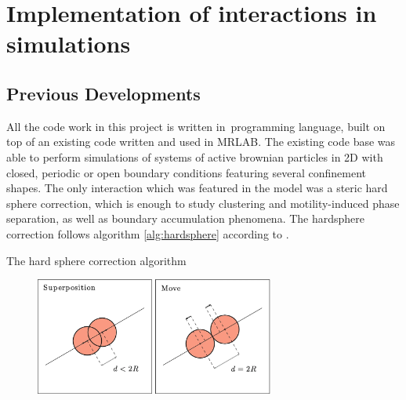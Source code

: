 \documentclass[../../master_thesis_np.tex]{subfiles}
\begin{document}
\chapter[Interaction Implementation]{Implementation of interactions in simulations}
	\section{Previous Developments}
	All the code work in this project is written in\ \julia programming language, built on top of an existing code written and used in {\color{blue} MRLAB}. The existing code base was able to perform simulations of systems of active brownian particles in 2D with closed, periodic or open boundary conditions featuring several confinement shapes. The only interaction which was featured in the model was a steric hard sphere correction, which is enough to study clustering and motility-induced phase  separation, as well as boundary accumulation phenomena. The hardsphere correction follows algorithm \ref{alg:hardsphere} according to \parencite{callegari_numerical_2019}.
	\parencite{martin-gomez_collective_2018}

	\begin{algorithm}[htp]
		\caption{The hard sphere correction algorithm} \label{alg:hardsphere}	
		\begin{algorithmic}[1]
			 

			\EndIf
			\EndFor
		\end{algorithmic}
		\end{algorithm}

		\begin{figure}[htp]
			\centering
			\includegraphics[width = 0.7\textwidth]{callegari_volpe_2019_hardsphere.png}
			\label{fig:hardsphere}
			\caption{{\small {}}}
		\end{figure}
\end{document}

